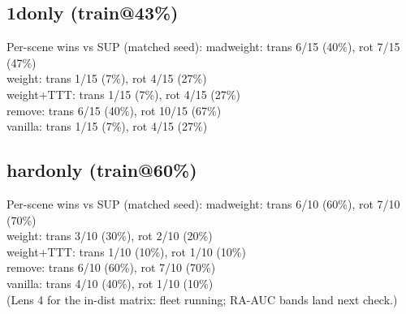 \documentclass[10pt]{article}
\begin{document}
\subsection*{1donly (train@43\%)}
\begin{center}\end{center}
Per-scene wins vs SUP (matched seed):
\indent madweight: trans 6/15 (40\%), rot 7/15 (47\%)\\
\indent weight: trans 1/15 (7\%), rot 4/15 (27\%)\\
\indent weight+TTT: trans 1/15 (7\%), rot 4/15 (27\%)\\
\indent remove: trans 6/15 (40\%), rot 10/15 (67\%)\\
\indent vanilla: trans 1/15 (7\%), rot 4/15 (27\%)\\
\subsection*{hardonly (train@60\%)}
\begin{center}\end{center}
Per-scene wins vs SUP (matched seed):
\indent madweight: trans 6/10 (60\%), rot 7/10 (70\%)\\
\indent weight: trans 3/10 (30\%), rot 2/10 (20\%)\\
\indent weight+TTT: trans 1/10 (10\%), rot 1/10 (10\%)\\
\indent remove: trans 6/10 (60\%), rot 7/10 (70\%)\\
\indent vanilla: trans 4/10 (40\%), rot 1/10 (10\%)\\
(Lens 4 for the in-dist matrix: fleet running; RA-AUC bands land next check.)
\end{document}
